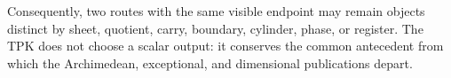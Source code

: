 Consequently, two routes with the same visible endpoint may remain
objects distinct by sheet, quotient, carry, boundary, cylinder, phase, or
register. The TPK does not choose a scalar output: it conserves the common antecedent
from which the Archimedean, exceptional, and dimensional publications depart.

\long{}
